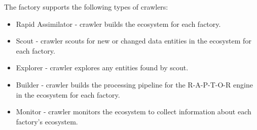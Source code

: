 The factory supports the following types of crawlers:
\begin{itemize}
    \item Rapid Assimilator - crawler builds the ecosystem for each factory.
    \item Scout - crawler scouts for new or changed data entities in the ecosystem for each factory.
    \item Explorer - crawler explores any entities found by scout.
    \item Builder - crawler builds the processing pipeline for the R-A-P-T-O-R engine in the ecosystem for each factory.
    \item Monitor - crawler monitors the ecosystem to collect information about each factory's ecosystem.
\end{itemize}

